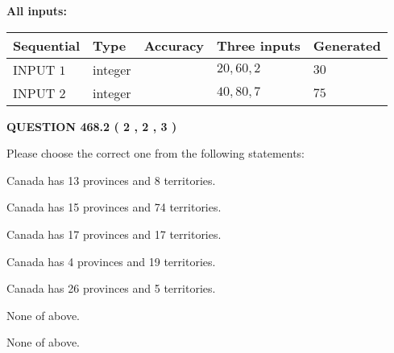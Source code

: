 \documentclass[12pt]{article}
\begin{document}
   
   
   
\noindent{}
   
   
   
   
\noindent\vspace{0.1in}\hspace{-0.08in} {\textbf{\Large{All inputs: }}}
   
   
  
  
\noindent\begin{tabular}{|l|l|l|l|l|}
\hline
 Sequential & Type & Accuracy & Three inputs & Generated \\ 
\hline
 
 
  INPUT $  1 $ & integer &  & $
 20
 , 
 60
 , 
 2
 $ & $ 30 $ 
 \\  \hline  
 
 
  INPUT $  2 $ & integer &  & $
 40
 , 
 80
 , 
 7
 $ & $ 75 $ 
 \\  \hline  
 \end{tabular}
   
   
  
\vspace{0.2in}
  
{\textbf{\Large{QUESTION
468.2 
 ( 2 , 2 , 3 )
}}}
  
  
Please choose the correct one from the following statements:
 
 
Canada has  13 provinces and  8 territories.
 
 
Canada has  15 provinces and  74 territories.
 
 
Canada has  17 provinces and  17 territories.
 
 
Canada has   4 provinces and  19 territories.
 
 
Canada has  26 provinces and  5 territories.
 
 
 None of above.
 
 
\noindent{}
 
 
 None of above.
 
 
\noindent{}
 
 
   
   
   
\end{document}
